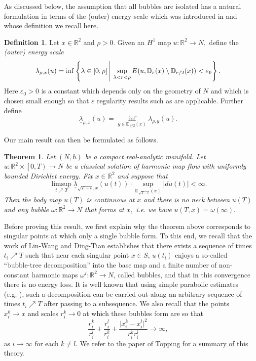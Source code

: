 \documentclass[10pt,reqno]{amsart}
\theoremstyle{plain}
\newtheorem{thm}[lemma]{Theorem}
\theoremstyle{definition}
\newtheorem{defn}[lemma]{Definition}
\numberwithin{equation}{section}
\newcommand{\om}{\omega}
\newcommand{\D}{\mathbb{D}}
\newcommand{\R}{\ensuremath{{\mathbb R}}}
\newcommand{\beq}{\begin{equation}}
\newcommand{\eeq}{\end{equation}}
\newcommand{\abs}[1]{\vert#1\vert}
\newcommand{\eps}{\varepsilon}
\begin{document}
As discussed below, the assumption that all bubbles are isolated has a natural formulation in terms of the (outer) energy scale which was introduced in 
 \cite[Definition 4.2]{songwaldron} and whose definition we recall here.
\begin{defn}
Let $x\in \R^2$ and $\rho > 0.$ Given an $H^1$ map $u: \R^2 \to N,$  define the \emph{(outer) energy scale} %
\begin{equation}\label{lambdadef}
\lambda_{\rho, x}(u) = \inf \left\{ \lambda \in [0,\rho] \,\, \vrule \,\, \sup_{\lambda<r<\rho} E( u, \D_r(x)\setminus \D_{r/2}(x) ) < \eps_0 \right\}.
\end{equation}
Here $\eps_0 > 0$ is a constant  which depends only on the geometry of $N$ and which is chosen small enough so that $\eps$ regularity results such as \cite[Theorem 3.4]{songwaldron} are applicable.  
Further define
\begin{equation*}
    \underline{\lambda}_{\rho, x}(u) = \inf_{y \in \D_{\rho / 2}(x)} \lambda_{\rho,y}(u).
\end{equation*}
\end{defn}


Our main result can then be formulated as follows. 

\begin{thm}\label{thm:main} Let $(N, h)$ be a compact real-analytic manifold. Let $u : \R^2 \times \left[ 0, T \right) \to N$ be a classical solution of harmonic map flow with uniformly bounded Dirichlet energy.
Fix $x \in \R^2$ and suppose that
\begin{equation}\label{main:assumption}
    \limsup_{t \nearrow T} \underline{\lambda}_{\sqrt{T - t}, x}(u(t)) \cdot \sup_{\D_{\sqrt{T - t}}(x)} |du(t)| < \infty.
\end{equation}
Then the body map $u(T)$ is continuous at $x$ and there is no neck between $u(T)$ and any bubble $\om:\R^2\to N$ that forms at $x,$ i.e. we have $u(T,x)=\om(\infty).$
\end{thm}

Before proving this result, we first explain why the theorem above corresponds to singular points at which only a single bubble form. To this end, we recall that the work of Lin-Wang \cite{linwangenergyidentity} and Ding-Tian \cite{dingtian} establishes that there exists a sequence of times $t_i \nearrow T$ such that near each singular point $x\in S$, $u(t_i)$ enjoys a so-called ``bubble-tree decomposition'' into the base map and a finite number of non-constant harmonic maps $\om^j:\R^2\to N$, called bubbles, and that in this convergence there is no energy loss. 
It is well known that using simple parabolic estimates (e.g. \cite[Theorem 3.4]{songwaldron}), such a decomposition can be carried out along an arbitrary sequence of times $t_i \nearrow T$ after passing to a subsequence. We also recall that the points $x_i^k\to x$ and scales $r_i^k\to 0$ at which these bubbles form are so that 
\beq\label{est:bubbling}
\frac{r_i^k}{r_i^l} + \frac{r_i^l}{r_i^k} + \frac{\abs{x_i^k - x_i^l}^2}{r_i^k r_i^l} \to \infty ,
\eeq
as $i \to \infty$ for each $k \neq l$. 
We refer to the paper of Topping \cite{toppingannals} for a summary of this theory. 
\end{document}
